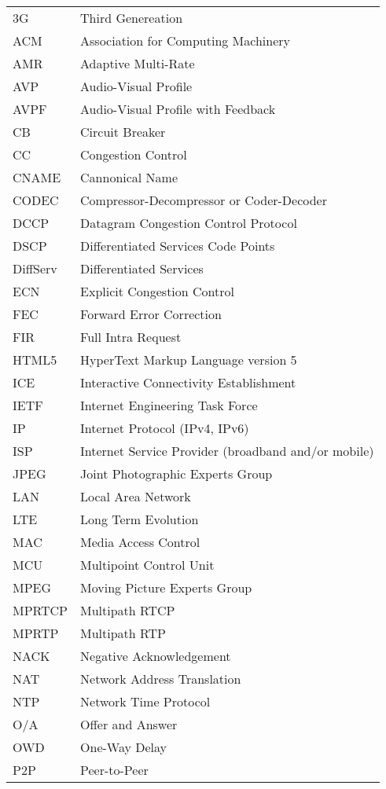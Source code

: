 \begin{longtable}{ll}
3G  	& Third Genereation \\
ACM 	& Association for Computing Machinery \\
AMR 	& Adaptive Multi-Rate \\
AVP 	& Audio-Visual Profile \\
AVPF	& Audio-Visual Profile with Feedback \\
CB  	& Circuit Breaker \\
CC  	& Congestion Control \\
CNAME	& Cannonical Name \\
CODEC	& Compressor-Decompressor or Coder-Decoder \\
DCCP 	& Datagram Congestion Control Protocol \\
DSCP 	& Differentiated Services Code Points \\
DiffServ	& Differentiated Services \\
ECN  	& Explicit Congestion Control \\
FEC  	& Forward Error Correction \\
FIR 	& Full Intra Request \\
HTML5	& HyperText Markup Language version 5\\
ICE  	& Interactive Connectivity Establishment \\
IETF	& Internet Engineering Task Force \\
IP  	& Internet Protocol (IPv4, IPv6)\\
ISP 	& Internet Service Provider (broadband and/or mobile) \\
JPEG 	& Joint Photographic Experts Group \\
LAN 	& Local Area Network \\
LTE 	& Long Term Evolution \\
MAC 	& Media Access Control \\
MCU 	& Multipoint Control Unit \\
MPEG 	& Moving Picture Experts Group \\
MPRTCP	& Multipath RTCP \\
MPRTP 	& Multipath RTP \\
NACK 	& Negative Acknowledgement \\
NAT 	& Network Address Translation \\
NTP  	& Network Time Protocol \\
O/A  	& Offer and Answer \\
OWD 	& One-Way Delay \\
P2P 	& Peer-to-Peer \\

\end{longtable}
